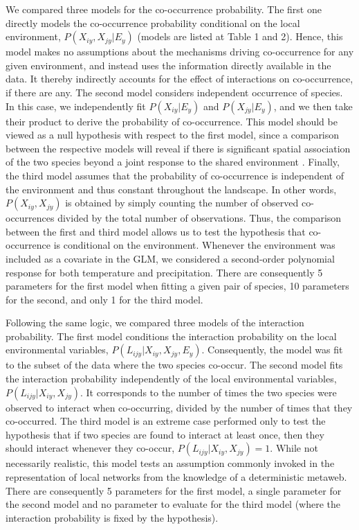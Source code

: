 \documentclass[12pt]{article}
\begin{document}
We compared three models for the co-occurrence probability. The first one
directly models the co-occurrence probability conditional on the local
environment, $P(X_{iy},X_{jy}|E_y)$ (models are listed at Table 1 and 2).
Hence, this model makes no assumptions about the mechanisms driving co-occurrence
for any given environment, and instead uses the information directly
available in the data. It thereby indirectly accounts for the effect of
interactions on co-occurrence, if there are any. The second model considers
independent occurrence of species. In this case, we independently fit
$P(X_{iy} |E_y)$ and $P(X_{jy} |E_y)$, and we then take their product to derive
the probability of co-occurrence. This model should be viewed as a null
hypothesis with respect to the first model, since a comparison between the
respective models will reveal if there is significant spatial association of
the two species beyond a joint response to the shared environment
\citep{Cazelles2015}. Finally, the third model assumes that the probability of
co-occurrence is independent of the environment and thus constant throughout
the landscape. In other words, $P(X_{iy},X_{jy})$ is obtained by simply counting the
number of observed co-occurrences divided by the total number of observations.
Thus, the comparison between the first and third model allows us to test the
hypothesis that co-occurrence is conditional on the environment. Whenever the
environment was included as a covariate in the GLM, we considered a second-order
polynomial response for both temperature and precipitation. There are
consequently 5 parameters for the first model when fitting a given pair of
species, 10 parameters for the second, and only 1 for the third model.

Following the same logic, we compared three models of the interaction
probability. The first model conditions the interaction probability on the
local environmental variables, $P(L_{ijy}|X_{iy},X_{jy},E_y)$. Consequently,
the model was fit to the subset of the data where the two species co-occur.
The second model fits the interaction probability independently of the local
environmental variables, $P(L_{ijy}|X_{iy},X_{jy})$. It corresponds to the
number of times the two species were observed to interact when co-occurring,
divided by the number of times that they co-occurred. The third model is an
extreme case performed only to test the hypothesis that if two species are
found to interact at least once, then they should interact whenever they co-occur,
$P(L_{ijy}|X_{iy},X_{jy})=1$. While not necessarily realistic, this
model tests an assumption commonly invoked in the representation of local
networks from the knowledge of a deterministic metaweb. There are consequently
5 parameters for the first model, a single parameter for the second model and
no parameter to evaluate for the third model (where the interaction
probability is fixed by the hypothesis).
\end{document}
